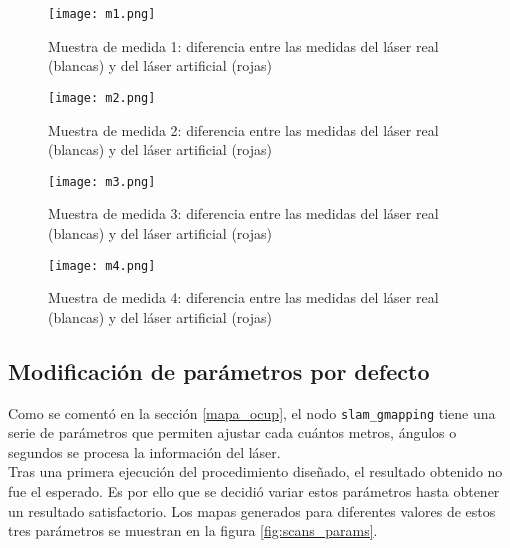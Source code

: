 \begin{figure}[H]
	\begin{center} 
		\texttt{[image: m1.png]}
	\end{center}
	\caption{Muestra de medida 1: diferencia entre las medidas del láser real (blancas) y del láser artificial (rojas)}
	\label{fig:m1}
\end{figure}

\begin{figure}[H]
	\begin{center} 
		\texttt{[image: m2.png]}
	\end{center}
	\caption{Muestra de medida 2: diferencia entre las medidas del láser real (blancas) y del láser artificial (rojas)}
	\label{fig:m2}
\end{figure}

\begin{figure}[H]
	\begin{center} 
		\texttt{[image: m3.png]}
	\end{center}
	\caption{Muestra de medida 3: diferencia entre las medidas del láser real (blancas) y del láser artificial (rojas)}
	\label{fig:m3}
\end{figure}

\begin{figure}[H]
	\begin{center} 
		\texttt{[image: m4.png]}
	\end{center}
	\caption{Muestra de medida 4: diferencia entre las medidas del láser real (blancas) y del láser artificial (rojas)}
	\label{fig:m4}
\end{figure}

\subsection{Modificación de parámetros por defecto}

Como se comentó en la sección \ref{mapa_ocup}, el nodo \texttt{slam\_gmapping} tiene una serie de parámetros que permiten ajustar cada cuántos metros, ángulos o segundos se procesa la información del láser.\\

Tras una primera ejecución del procedimiento diseñado, el resultado obtenido no fue el esperado. Es por ello que se decidió variar estos parámetros hasta obtener un resultado satisfactorio. Los mapas generados para diferentes valores de estos tres parámetros se muestran en la figura \ref{fig:scans_params}.\\

